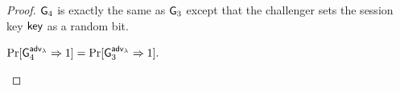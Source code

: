 \begin{proof}
 $\mathsf{G}_4$ is exactly the same as $\mathsf{G}_3$ except that the challenger sets the session key $\mathsf{key}$ as a random bit. 
\begin{lemma}
\label{lem:ncnike-3}
$
\Pr[\mathsf{G}_4^{{\mathsf{adv}}_\lambda}\Rightarrow 1]=\Pr[\mathsf{G}_3^{{\mathsf{adv}}_\lambda}\Rightarrow 1].
$
\end{lemma}
%

\end{proof}
